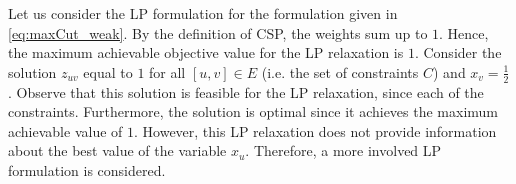 Let us consider the LP formulation for the formulation given in \eqref{eq:maxCut_weak}. 
By the definition of CSP, the weights sum up to $1$. 
Hence, the maximum achievable objective value for the LP relaxation is $1$. 
Consider the solution $z_{uv}$ equal to $1$ for all $[u,v] \in E$ (i.e. the set of constraints $C$) and $x_v = \frac{1}{2}$. 
Observe that this solution is feasible for the LP relaxation, since each of the constraints. Furthermore, the solution is optimal since it achieves the maximum achievable value of $1$. 
However, this LP relaxation does not provide information about the best value of the variable $x_u$. 
Therefore, a more involved LP formulation is considered.
\fi